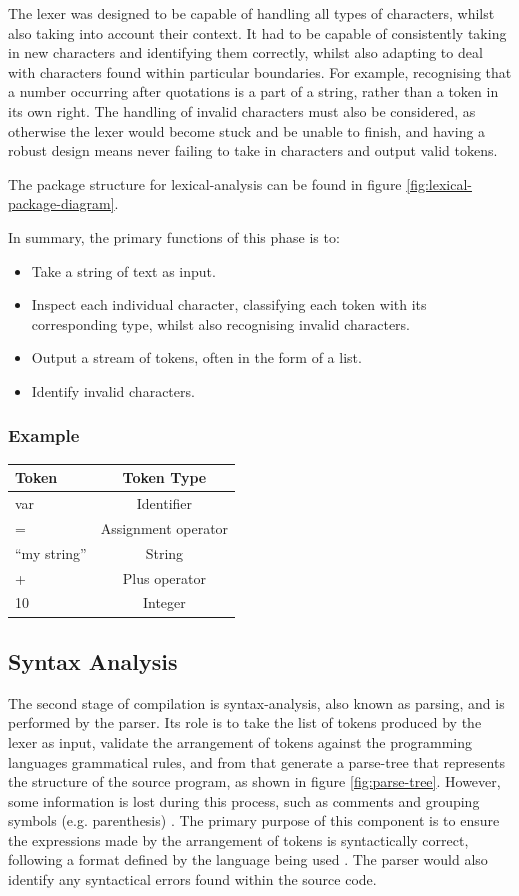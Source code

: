 \documentclass[
]{report}
\begin{document}
The lexer was designed to be capable of handling all types of
characters, whilst also taking into account their context. It had to be
capable of consistently taking in new characters and identifying them
correctly, whilst also adapting to deal with characters found within
particular boundaries. For example, recognising that a number occurring
after quotations is a part of a string, rather than a \gls{token} in its own
right. The handling of invalid characters must also be considered, as
otherwise the lexer would become stuck and be unable to finish, and
having a robust design means never failing to take in characters and
output valid \glspl{token}. 

The package structure for \gls{lexical-analysis} can be found in figure \ref{fig:lexical-package-diagram}.

In summary, the primary functions of this phase is to:
\begin{itemize}
	\item Take a string of text as input. 
	\item Inspect each individual character, classifying each \gls{token} with its corresponding type, whilst also recognising invalid characters. 
	\item Output a stream of \glspl{token}, often in the form of a list.
	\item Identify invalid characters.
\end{itemize}

\subsubsection{Example}
\begin{longtable}[l]{@{}lc@{}}
\toprule
Token & Token Type\tabularnewline
\midrule
\endhead
var & Identifier\tabularnewline
= & Assignment operator\tabularnewline
``my string'' & String\tabularnewline
+ & Plus operator\tabularnewline
10 & Integer\tabularnewline
\bottomrule
\end{longtable}

\subsection{Syntax Analysis}
The second stage of compilation is \gls{syntax-analysis}, also known as
\gls{parsing}, and is performed by the parser. Its role is to take the list of
\glspl{token} produced by the lexer as input, validate the arrangement of
\glspl{token} against the programming languages grammatical rules, and from
that generate a \gls{parse-tree} that represents the structure of the source
program, as shown in figure \ref{fig:parse-tree}. However, some information
is lost during this process, such as comments and grouping symbols
(e.g. parenthesis) \cite{parsing-tools}. The primary purpose of this component
is to ensure the \glspl{expression} made by the arrangement of \glspl{token}
is syntactically correct, following a format defined by the language being
used \cite{tutorials-guide}. The parser would also identify any syntactical
errors found within the source code.
\end{document}
